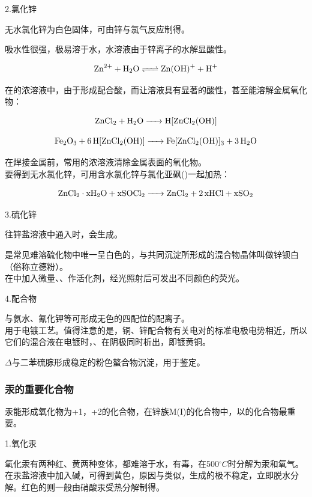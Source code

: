 \documentclass[a4paper,UTF8]{article}
\begin{document}
2.氯化锌

无水氯化锌为白色固体，可由锌与氯气反应制得。

吸水性很强，极易溶于水，水溶液由于锌离子的水解显酸性。

$$ \ce{Zn^{2+} + H2O <=> Zn(OH)+ + H+} $$

在的浓溶液中，由于形成配合酸，而让溶液具有显著的酸性，甚至能溶解金属氧化物：

$$ \ce{ZnCl2 + H2O -> H[ZnCl2(OH)]} $$

$$ \ce{Fe2O3 + 6H[ZnCl2(OH)] -> Fe[ZnCl2(OH)]3 + 3H2O} $$

在焊接金属前，常用的浓溶液清除金属表面的氧化物。\\

要得到无水氯化锌，可用含水氯化锌与氯化亚砜()一起加热：

$$ \ce{ZnCl2\cdot xH2O + xSOCl2 -> ZnCl2 + 2xHCl + xSO2} $$

3.硫化锌

往锌盐溶液中通入时，会生成。

是常见难溶硫化物中唯一呈白色的，与共同沉淀所形成的混合物晶体叫做锌钡白（俗称立德粉）。\\

在中加入微量、、作活化剂，经光照射后可发出不同颜色的荧光。

4.配合物

与氨水、氰化钾等可形成无色的四配位的配离子。\\

用于电镀工艺。值得注意的是，铜、锌配合物有关电对的标准电极电势相近，所以它们的混合液在电镀时，、在阴极同时析出，即镀黄铜。

$\Delta$与二苯硫腙形成稳定的粉色螯合物沉淀，用于鉴定。

\subsubsection{汞的重要化合物}

汞能形成氧化物为+1，+2的化合物，在锌族M(I)的化合物中，以的化合物最重要。

1.氧化汞

氧化汞有两种红、黄两种变体，都难溶于水，有毒，在500$^\circ C$时分解为汞和氧气。在汞盐溶液中加入碱，可得到黄色，原因与类似，生成的极不稳定，立即脱水分解。红色的则一般由硝酸汞受热分解制得。
\end{document}
